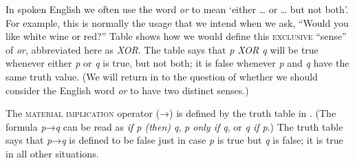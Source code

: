 In spoken English we often use the word \textit{or} to mean ‘either … or … but not both’. For example, this is normally the usage that we intend when we ask, “Would you like white wine or red?” Table  shows how we would define this \textsc{exclusive} “sense” of \textit{or}, abbreviated here as \textit{XOR}. The table says that \textit{p XOR q} will be true whenever either \textit{p} or \textit{q} is true, but not both; it is false whenever \textit{p} and \textit{q} have the same truth value. (We will return in  to the question of whether we should consider the English word \textit{or} to have two distinct senses.)



The \textsc{material} \textsc{implication} operator (→) is defined by the truth table in . (The formula \textit{p}→\textit{q} can be read as \textit{if p (then) q}, \textit{p only if q}, or \textit{q if p}.) The truth table says that \textit{p}→\textit{q} is defined to be false just in case \textit{p} is true but \textit{q} is false; it is true in all other situations.



